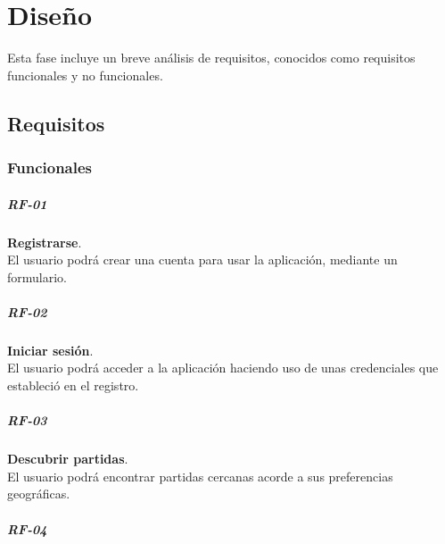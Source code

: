 \cleardoublepage



\chapter{Diseño}

    Esta fase incluye un breve análisis de requisitos, conocidos como requisitos funcionales y no funcionales.

    \section{Requisitos}


        \subsection{Funcionales}

            \paragraph{RF-01}

                \textbf{Registrarse}. \\
                El usuario podrá crear una cuenta para usar la aplicación, mediante un formulario.

            \paragraph{RF-02}

                \textbf{Iniciar sesión}. \\
                El usuario podrá acceder a la aplicación haciendo uso de unas credenciales que estableció en el registro.

            \paragraph{RF-03}

                \textbf{Descubrir partidas}. \\
                El usuario podrá encontrar partidas cercanas acorde a sus preferencias geográficas.

            \paragraph{RF-04}

